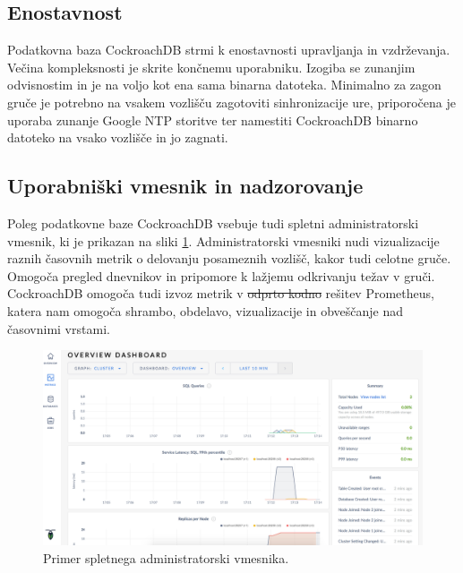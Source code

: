 \documentclass[a4paper, 12pt]{book}
\providecommand{\DIFaddtex}[1]{{\protect\color{blue}\uwave{#1}}} %
\providecommand{\DIFdeltex}[1]{{\protect\color{red}\sout{#1}}}                      %
\providecommand{\DIFaddbegin}{} %
\providecommand{\DIFaddend}{} %
\providecommand{\DIFdelbegin}{} %
\providecommand{\DIFdelend}{} %
\providecommand{\DIFadd}[1]{\texorpdfstring{\DIFaddtex{#1}}{#1}} %
\providecommand{\DIFdel}[1]{\texorpdfstring{\DIFdeltex{#1}}{}} %
\newcommand{\DIFscaledelfig}{0.5}
\newlength{\DIFdelgraphicswidth} %
\newlength{\DIFdelgraphicsheight} %
\newcommand{\DIFaddincludegraphics}[2][]{{\color{blue}\fbox{\DIFOincludegraphics[#1]{#2}}}} %
\newcommand{\DIFdelincludegraphics}[2][]{%
\sbox{\DIFdelgraphicsbox}{\DIFOincludegraphics[#1]{#2}}%
\settoboxwidth{\DIFdelgraphicswidth}{\DIFdelgraphicsbox} %
\settoboxtotalheight{\DIFdelgraphicsheight}{\DIFdelgraphicsbox} %
\scalebox{\DIFscaledelfig}{%
\parbox[b]{\DIFdelgraphicswidth}{\usebox{\DIFdelgraphicsbox}\\[-\baselineskip] \rule{\DIFdelgraphicswidth}{0em}}\llap{\resizebox{\DIFdelgraphicswidth}{\DIFdelgraphicsheight}{%
\setlength{\unitlength}{\DIFdelgraphicswidth}%
\begin{picture}(1,1)%
\thicklines\linethickness{2pt} %
{\color[rgb]{1,0,0}\put(0,0){\framebox(1,1){}}}%
{\color[rgb]{1,0,0}\put(0,0){\line( 1,1){1}}}%
{\color[rgb]{1,0,0}\put(0,1){\line(1,-1){1}}}%
\end{picture}%
}\hspace*{3pt}}} %
} %
\DeclareRobustCommand{\DIFaddbegin}{\DIFOaddbegin \let\includegraphics\DIFaddincludegraphics} %
\DeclareRobustCommand{\DIFaddend}{\DIFOaddend \let\includegraphics\DIFOincludegraphics} %
\DeclareRobustCommand{\DIFdelbegin}{\DIFOdelbegin \let\includegraphics\DIFdelincludegraphics} %
\DeclareRobustCommand{\DIFdelend}{\DIFOaddend \let\includegraphics\DIFOincludegraphics} %
\begin{document}
\subsection{Enostavnost}
Podatkovna baza CockroachDB strmi k enostavnosti upravljanja in vzdr\-že\-van\-ja. Večina kompleksnosti je skrite končnemu uporabniku. Izogiba se zunanjim odvisnostim in je na voljo kot ena sama binarna datoteka. Minimalno za zagon gruče je potrebno na vsakem vozlišču zagotoviti sinhronizacije ure, priporočena je uporaba zunanje Google NTP storitve ter namestiti CockroachDB binarno datoteko na vsako vozlišče in jo zagnati.

\subsection{Uporabniški vmesnik in nadzorovanje}
Poleg podatkovne baze CockroachDB vsebuje tudi spletni administratorski vmesnik, ki je prikazan na sliki \ref{img_crdb_admin_ui}. Administratorski vmesniki nudi vizualizacije raznih časovnih metrik o delovanju posameznih vozlišč, kakor tudi celotne gruče. Omogoča pregled dnevnikov in pripomore k lažjemu odkrivanju težav v gruči. CockroachDB omogoča tudi izvoz metrik v \DIFdelbegin \DIFdel{odprto kodno }\DIFdelend \DIFaddbegin \DIFadd{odprtokodno }\DIFaddend rešitev Prometheus, katera nam omogoča shrambo, obdelavo, vizualizacije in obveščanje nad časovnimi vrstami.

\begin{figure}[H]
\begin{center}
\includegraphics[width=1\textwidth]{resources/crdb_admin_ui.png}
\end{center}
\caption{Primer spletnega administratorski vmesnika.}
\label{img_crdb_admin_ui}
\end{figure}
\end{document}
